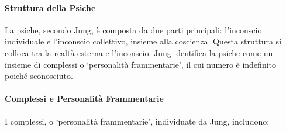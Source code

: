 \documentclass{subfiles}\
\begin{document}
\paragraph*{Struttura della Psiche}
La psiche, secondo Jung, è composta da due parti principali: l'inconscio individuale e 
l'inconscio collettivo, insieme alla coscienza. 
Questa struttura si colloca tra la realtà esterna e l'inconscio. 
Jung identifica la psiche come un insieme di complessi o `personalità frammentarie', il cui 
numero è indefinito poiché sconosciuto. \\

\paragraph*{Complessi e Personalità Frammentarie}
I complessi, o `personalità frammentarie', individuate da Jung, includono: 
\end{document}
